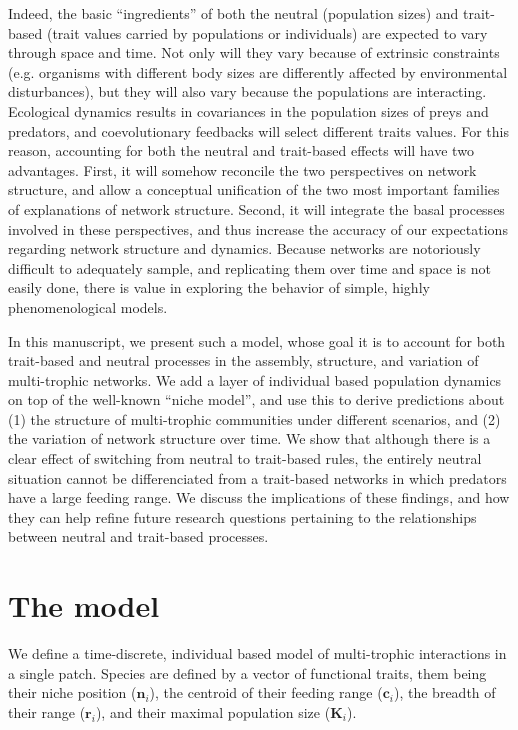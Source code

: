 \documentclass[10pt,twocolumn,fleqn]{article}
\begin{document}
Indeed, the basic ``ingredients'' of both the neutral (population sizes) and
trait-based (trait values carried by populations or individuals) are expected to
vary through space and time. Not only will they vary because of extrinsic
constraints (e.g. organisms with different body sizes are differently affected
by environmental disturbances), but they will also vary because the populations
are interacting. Ecological dynamics results in covariances in the population
sizes of preys and predators, and coevolutionary feedbacks will select different
traits values. For this reason, accounting for both the neutral and trait-based
effects will have two advantages. First, it will somehow reconcile the two
perspectives on network structure, and allow a conceptual unification of the two
most important families of explanations of network structure. Second, it will
integrate the basal processes involved in these perspectives, and thus increase
the accuracy of our expectations regarding network structure and dynamics.
Because networks are notoriously difficult to adequately sample, and replicating
them over time and space is not easily done, there is value in exploring the
behavior of simple, highly phenomenological models.

In this manuscript, we present such a model, whose goal it is to account for
both trait-based and neutral processes in the assembly, structure, and variation
of multi-trophic networks. We add a layer of individual based population
dynamics on top of the well-known ``niche model'', and use this to derive
predictions about (1) the structure of multi-trophic communities under different
scenarios, and (2) the variation of network structure over time. We show that
although there is a clear effect of switching from neutral to trait-based rules,
the entirely neutral situation cannot be differenciated from a trait-based
networks in which predators have a large feeding range. We discuss the
implications of these findings, and how they can help refine future research
questions pertaining to the relationships between neutral and trait-based
processes.

\section{The model}

We define a time-discrete, individual based model of multi-trophic interactions
in a single patch. Species are defined by a vector of functional traits, them
being their niche position ($\mathbf{n}_i$), the centroid of their feeding range
($\mathbf{c}_i$), the breadth of their range ($\mathbf{r}_i$), and their maximal
population size ($\mathbf{K}_i$).
\end{document}

